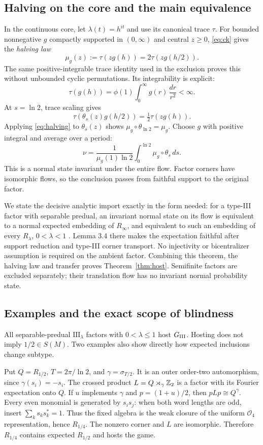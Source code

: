 \subsection{Halving on the core and the main equivalence}
In the continuous core, let $\lambda(t)=h^{it}$ and use its canonical trace $\tau$. For bounded nonnegative $g$ compactly supported in $(0,\infty)$ and central $z\ge0$, \eqref{eq:ck} gives the \emph{halving law}
\begin{equation}\label{eq:halving}
 \mu_g(z):=\tau(zg(h))=2\tau(zg(h/2)).
\end{equation}
The same positive-integrable trace identity used in the exclusion proves this without unbounded cyclic permutations. Its integrability is explicit:
\[
 \tau(g(h))=\phi(1)\int_0^\infty g(r)\,\frac{dr}{r^2}<\infty.
\]
At $s=\ln2$, trace scaling gives
\[
 \tau(\theta_s(z)g(h/2))=\tfrac12\tau(zg(h)).
\]
Applying \eqref{eq:halving} to $\theta_s(z)$ shows $\mu_g\circ\theta_{\ln2}=\mu_g$. Choose $g$ with positive integral and average over a period:
\[
 \nu=\frac1{\mu_g(1)\ln2}\int_0^{\ln2}\mu_g\circ\theta_s\,ds.
\]
This is a normal state invariant under the entire flow. Factor corners have isomorphic flows, so the conclusion passes from faithful support to the original factor.

We state the decisive analytic import exactly in the form needed: for a type-III factor with separable predual, an invariant normal state on its flow is equivalent to a normal expected embedding of $R_\infty$, and equivalent to such an embedding of every $R_\lambda$, $0<\lambda<1$ \cite[Theorem 3.5]{HM}. Lemma 3.4 there makes the expectation faithful after support reduction and type-III corner transport. No injectivity or bicentralizer assumption is required on the ambient factor. Combining this theorem, the halving law and transfer proves Theorem~\ref{thm:host}. Semifinite factors are excluded separately; their translation flow has no invariant normal probability state.

\subsection{Examples and the exact scope of blindness}
All separable-predual $\mathrm{III}_\lambda$ factors with $0<\lambda\le1$ host $G_{\mathrm{III}}$. Hosting does not imply $1/2\in S(M)$. Two examples also show directly how expected inclusions change subtype.

Put $Q=R_{1/2}$, $T=2\pi/\ln2$, and $\gamma=\sigma_{T/2}$. It is an outer order-two automorphism, since $\gamma(s_i)=-s_i$. The crossed product $L=Q\rtimes_\gamma\mathbb Z_2$ is a factor with its Fourier expectation onto $Q$. If $u$ implements $\gamma$ and $p=(1+u)/2$, then $pLp\cong Q^\gamma$. Every even monomial is generated by $s_is_j$: when both word lengths are odd, insert $\sum_k s_ks_k^*=1$. Thus the fixed algebra is the weak closure of the uniform $\mathcal O_4$ representation, hence $R_{1/4}$. The nonzero corner and $L$ are isomorphic. Therefore $R_{1/4}$ contains expected $R_{1/2}$ and hosts the game.

